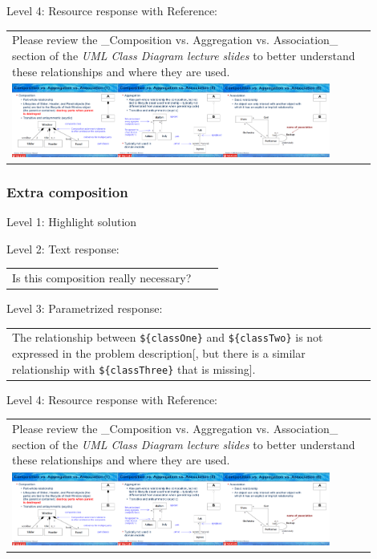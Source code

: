 \noindent Level 4: Resource response with Reference: \medskip

\begin{tabular}{|p{0.9\linewidth}}
Please review the _Composition vs. Aggregation vs. Association_ section of 
the \textit{UML Class Diagram lecture slides} to 
better understand these relationships and where they are used.

\\
\includegraphics[width=0.9\textwidth]{images/composition_aggregation_association.png}
\end{tabular} \medskip


\subsubsection{Extra composition}

\noindent Level 1: Highlight solution \medskip

\noindent Level 2: Text response: \medskip

\begin{tabular}{|p{0.9\linewidth}}
Is this composition really necessary?
\end{tabular} \medskip

\noindent Level 3: Parametrized response: \medskip

\begin{tabular}{|p{0.9\linewidth}}
The relationship between \verb|${classOne}| and \verb|${classTwo}| is not expressed in the problem description[, but there is a similar relationship with \verb|${classThree}| that is missing].
\end{tabular} \medskip

\noindent Level 4: Resource response with Reference: \medskip

\begin{tabular}{|p{0.9\linewidth}}
Please review the _Composition vs. Aggregation vs. Association_ section of 
the \textit{UML Class Diagram lecture slides} to 
better understand these relationships and where they are used.

\\
\includegraphics[width=0.9\textwidth]{images/composition_aggregation_association.png}
\end{tabular} \medskip


